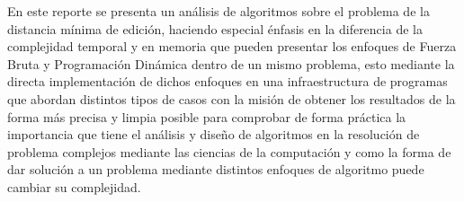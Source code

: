 En este reporte se presenta un análisis de algoritmos sobre el problema de la distancia mínima de edición, haciendo especial énfasis en la diferencia de la complejidad temporal y en memoria que pueden presentar los enfoques de Fuerza Bruta y Programación Dinámica dentro de un mismo problema, esto mediante la directa implementación de dichos enfoques en una infraestructura de programas que abordan distintos tipos de casos con la misión de obtener los resultados de la forma más precisa y limpia posible para comprobar de forma práctica la importancia que tiene el análisis y diseño de algoritmos en la resolución de problema complejos mediante las ciencias de la computación y como la forma de dar solución a un problema mediante distintos enfoques de algoritmo puede cambiar su complejidad.
